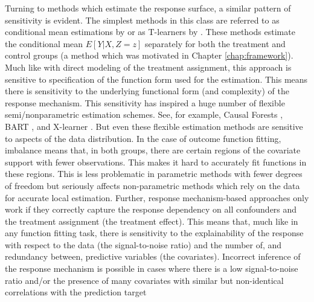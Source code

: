 \documentclass[../main.tex]{subfiles}
\begin{document}
\vspace{\baselineskip}
Turning to methods which estimate the response surface, a similar pattern of sensitivity is evident. The simplest methods in this class are referred to as conditional mean estimations by \textcite{Knaus2018MachineEvidence} or as T-learners by \textcite{Kunzel2019MetalearnersLearning}. These methods estimate the conditional mean  \( E \left[ Y \vert  X, Z=z \right]  \)  separately for both the treatment and control groups (a method which was motivated in Chapter \ref{chap:framework}). Much like with direct modeling of the treatment assignment, this approach is sensitive to specification of the function form used for the estimation. This means there is sensitivity to the underlying functional form (and complexity) of the response mechanism. This sensitivity has inspired a huge number of flexible semi/nonparametric estimation schemes. See, for example, Causal Forests \parencite{Athey2018ApproximateDimensions}, BART \parencite{Hill2011BayesianInference}, and X-learner \parencite{Kunzel2019MetalearnersLearning}. But even these flexible estimation methods are sensitive to aspects of the data distribution. In the case of outcome function fitting, imbalance means that, in both groups, there are certain regions of the covariate support with fewer observations. This makes it hard to accurately fit functions in these regions. This is less problematic in parametric methods with fewer degrees of freedom but seriously affects non-parametric methods which rely on the data for accurate local estimation. Further, response mechanism-based approaches only work if they correctly capture the response dependency on all confounders and the treatment assignment (the treatment effect). This means that, much like in any function fitting task, there is sensitivity to the explainability of the response with respect to the data (the signal-to-noise ratio) and the number of, and redundancy between, predictive variables (the covariates). Incorrect inference of the response mechanism is possible in cases where there is a low signal-to-noise ratio and/or the presence of many covariates with similar but non-identical correlations with the prediction target\par
\end{document}
